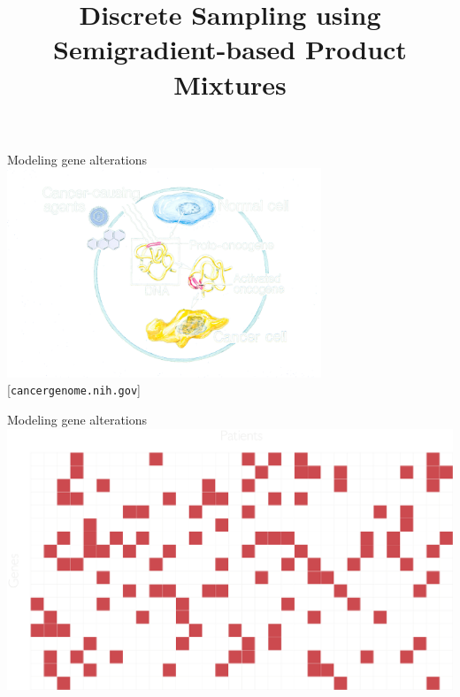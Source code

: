 \documentclass[mathserif]{beamer}
\title[Discrete Sampling using Semigradient-based Product Mixtures]
{Discrete Sampling using Semigradient-based Product Mixtures}
\author[Alkis Gotovos]{}
\newcommand{\qsource}[1]{%
{\color{col1}\scriptsize\hfill[#1]}
}
\begin{document}


\begin{frame}{Modeling gene alterations}
\includegraphics[width=3.7in]{figures/oncogene.png}\\
\qsource{\texttt{cancergenome.nih.gov}}
\end{frame}

\begin{frame}{Modeling gene alterations}
\centering
\includegraphics[width=\textwidth]{figures/grid_genes.pdf}
\end{frame}
\end{document}
